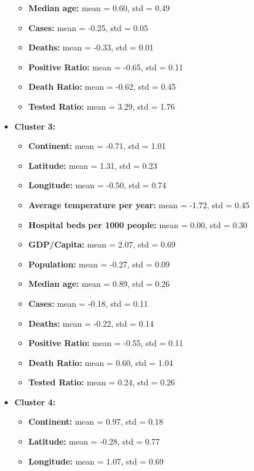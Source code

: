 \documentclass[12pt,a4paper]{article}
\begin{document}
\begin{itemize}
\begin{itemize}
            \item \textbf{Median age:} mean = 0.60, std = 0.49
            \item \textbf{Cases:} mean = -0.25, std = 0.05
            \item \textbf{Deaths:} mean = -0.33, std = 0.01
            \item \textbf{Positive Ratio:} mean = -0.65, std = 0.11
            \item \textbf{Death Ratio:} mean = -0.62, std = 0.45
            \item \textbf{Tested Ratio:} mean = 3.29, std = 1.76
        \end{itemize}
    \item \textbf{Cluster 3:} 
        \begin{itemize}
            \item \textbf{Continent:} mean = -0.71, std = 1.01
            \item \textbf{Latitude:} mean = 1.31, std = 0.23
            \item \textbf{Longitude:} mean = -0.50, std = 0.74
            \item \textbf{Average temperature per year:} mean = -1.72, std = 0.45
            \item \textbf{Hospital beds per 1000 people:} mean = 0.00, std = 0.30
            \item \textbf{GDP/Capita:} mean = 2.07, std = 0.69
            \item \textbf{Population:} mean = -0.27, std = 0.09
            \item \textbf{Median age:} mean = 0.89, std = 0.26
            \item \textbf{Cases:} mean = -0.18, std = 0.11
            \item \textbf{Deaths:} mean = -0.22, std = 0.14
            \item \textbf{Positive Ratio:} mean = -0.55, std = 0.11
            \item \textbf{Death Ratio:} mean = 0.60, std = 1.04
            \item \textbf{Tested Ratio:} mean = 0.24, std = 0.26
        \end{itemize}
    \item \textbf{Cluster 4:} 
        \begin{itemize}
            \item \textbf{Continent:} mean = 0.97, std = 0.18
            \item \textbf{Latitude:} mean = -0.28, std = 0.77
            \item \textbf{Longitude:} mean = 1.07, std = 0.69

\end{itemize}
\end{itemize}
\end{document}
